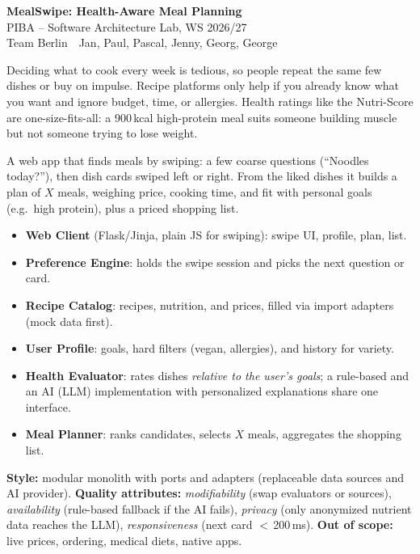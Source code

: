 \documentclass[11pt,a4paper]{article}
\newcommand{\pibapart}[1]{\vspace{0.4em}{\large\textbf{#1}}\par}
\newcommand{\projecttitle}{MealSwipe: Health-Aware Meal Planning}
\newcommand{\teamname}{Team Berlin}
\newcommand{\teammembers}{Jan, Paul, Pascal, Jenny, Georg, George}
\begin{document}
\begin{center}
  {\LARGE\textbf{\projecttitle}}\\[0.4em]
  {\large PIBA -- Software Architecture Lab, WS 2026/27}\\[0.3em]
  \teamname\ \textbullet\ \teammembers
\end{center}

\pibapart{Problem}
Deciding what to cook every week is tedious, so people repeat the same few dishes or buy on impulse.
Recipe platforms only help if you already know what you want and ignore budget, time, or allergies.
Health ratings like the Nutri-Score are one-size-fits-all: a 900\,kcal high-protein meal suits someone building muscle but not someone trying to lose weight.

\pibapart{Idea}
A web app that finds meals by swiping: a few coarse questions (``Noodles today?''), then dish cards swiped left or right.
From the liked dishes it builds a plan of $X$ meals, weighing price, cooking time, and fit with personal goals (e.g.\ high protein), plus a priced shopping list.
\begin{itemize}
  \item \textbf{Web Client} (Flask/Jinja, plain JS for swiping): swipe UI, profile, plan, list.
  \item \textbf{Preference Engine}: holds the swipe session and picks the next question or card.
  \item \textbf{Recipe Catalog}: recipes, nutrition, and prices, filled via import adapters (mock data first).
  \item \textbf{User Profile}: goals, hard filters (vegan, allergies), and history for variety.
  \item \textbf{Health Evaluator}: rates dishes \emph{relative to the user's goals}; a rule-based and an AI (LLM) implementation with personalized explanations share one interface.
  \item \textbf{Meal Planner}: ranks candidates, selects $X$ meals, aggregates the shopping list.
\end{itemize}
\textbf{Style:} modular monolith with ports and adapters (replaceable data sources and AI provider).
\textbf{Quality attributes:} \emph{modifiability} (swap evaluators or sources), \emph{availability} (rule-based fallback if the AI fails), \emph{privacy} (only anonymized nutrient data reaches the LLM), \emph{responsiveness} (next card $<$\,200\,ms).
\textbf{Out of scope:} live prices, ordering, medical diets, native apps.
\end{document}
